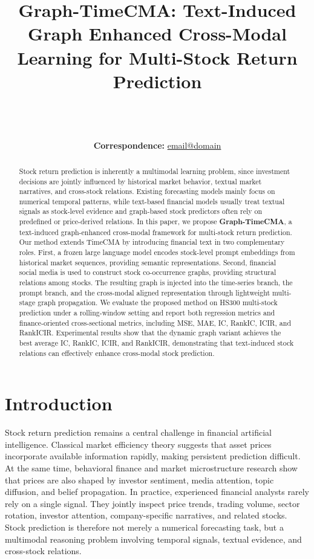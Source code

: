 \documentclass[11pt]{article}
\title{Graph-TimeCMA: Text-Induced Graph Enhanced Cross-Modal Learning for Multi-Stock Return Prediction}
\author{
\\
\\
\\
 \small{
   \textbf{Correspondence:} \href{mailto:email@domain}{email@domain}
 }
}
\begin{document}
\maketitle

\begin{abstract}
Stock return prediction is inherently a multimodal learning problem, since investment decisions are jointly influenced by historical market behavior, textual market narratives, and cross-stock relations. Existing forecasting models mainly focus on numerical temporal patterns, while text-based financial models usually treat textual signals as stock-level evidence and graph-based stock predictors often rely on predefined or price-derived relations. In this paper, we propose \textbf{Graph-TimeCMA}, a text-induced graph-enhanced cross-modal framework for multi-stock return prediction. Our method extends TimeCMA by introducing financial text in two complementary roles. First, a frozen large language model encodes stock-level prompt embeddings from historical market sequences, providing semantic representations. Second, financial social media is used to construct stock co-occurrence graphs, providing structural relations among stocks. The resulting graph is injected into the time-series branch, the prompt branch, and the cross-modal aligned representation through lightweight multi-stage graph propagation. We evaluate the proposed method on HS300 multi-stock prediction under a rolling-window setting and report both regression metrics and finance-oriented cross-sectional metrics, including MSE, MAE, IC, RankIC, ICIR, and RankICIR. Experimental results show that the dynamic graph variant achieves the best average IC, RankIC, ICIR, and RankICIR, demonstrating that text-induced stock relations can effectively enhance cross-modal stock prediction.
\end{abstract}

\section{Introduction}
Stock return prediction remains a central challenge in financial artificial intelligence. Classical market efficiency theory suggests that asset prices incorporate available information rapidly, making persistent prediction difficult. At the same time, behavioral finance and market microstructure research show that prices are also shaped by investor sentiment, media attention, topic diffusion, and belief propagation. In practice, experienced financial analysts rarely rely on a single signal. They jointly inspect price trends, trading volume, sector rotation, investor attention, company-specific narratives, and related stocks. Stock prediction is therefore not merely a numerical forecasting task, but a multimodal reasoning problem involving temporal signals, textual evidence, and cross-stock relations.
\end{document}

